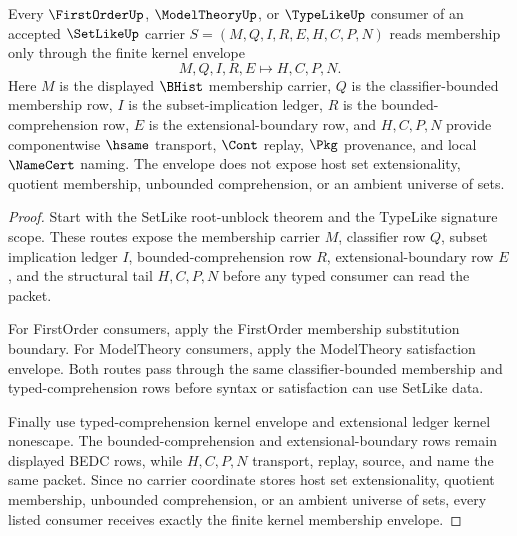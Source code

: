 \begin{theorem}
\label{thm:setlike-root-unblock-kernel-membership-envelope}
Every $\FirstOrderUp$, $\ModelTheoryUp$, or $\TypeLikeUp$ consumer of an accepted $\SetLikeUp$ carrier $S=(M,Q,I,R,E,H,C,P,N)$ reads membership only through the finite kernel envelope
$$
M,Q,I,R,E \longmapsto H,C,P,N .
$$
Here $M$ is the displayed $\BHist$ membership carrier, $Q$ is the classifier-bounded membership row, $I$ is the subset-implication ledger, $R$ is the bounded-comprehension row, $E$ is the extensional-boundary row, and $H,C,P,N$ provide componentwise $\hsame$ transport, $\Cont$ replay, $\Pkg$ provenance, and local $\NameCert$ naming. The envelope does not expose host set extensionality, quotient membership, unbounded comprehension, or an ambient universe of sets.
\end{theorem}
\begin{proof}
Start with the SetLike root-unblock theorem and the TypeLike signature scope. These routes expose the membership carrier $M$, classifier row $Q$, subset implication ledger $I$, bounded-comprehension row $R$, extensional-boundary row $E$, and the structural tail $H,C,P,N$ before any typed consumer can read the packet.

For FirstOrder consumers, apply the FirstOrder membership substitution boundary. For ModelTheory consumers, apply the ModelTheory satisfaction envelope. Both routes pass through the same classifier-bounded membership and typed-comprehension rows before syntax or satisfaction can use SetLike data.

Finally use typed-comprehension kernel envelope and extensional ledger kernel nonescape. The bounded-comprehension and extensional-boundary rows remain displayed BEDC rows, while $H,C,P,N$ transport, replay, source, and name the same packet. Since no carrier coordinate stores host set extensionality, quotient membership, unbounded comprehension, or an ambient universe of sets, every listed consumer receives exactly the finite kernel membership envelope.
\end{proof}


